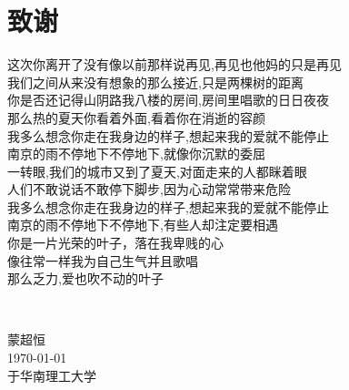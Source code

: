 \chapter{致\texorpdfstring{\quad}{}谢}
\begin{center}
这次你离开了没有像以前那样说再见,再见也他妈的只是再见 
~\\
我们之间从来没有想象的那么接近,只是两棵树的距离 
~\\
你是否还记得山阴路我八楼的房间,房间里唱歌的日日夜夜 
~\\
那么热的夏天你看着外面,看着你在消逝的容颜 
~\\
我多么想念你走在我身边的样子,想起来我的爱就不能停止 
~\\
南京的雨不停地下不停地下,就像你沉默的委屈 
~\\
一转眼,我们的城市又到了夏天,对面走来的人都眯着眼 
~\\
人们不敢说话不敢停下脚步,因为心动常常带来危险 
~\\
我多么想念你走在我身边的样子,想起来我的爱就不能停止 
~\\
南京的雨不停地下不停地下,有些人却注定要相遇 
~\\
你是一片光荣的叶子，落在我卑贱的心 
~\\
像往常一样我为自己生气并且歌唱 
~\\
那么乏力,爱也吹不动的叶子 
\end{center}

~\\

\begin{minipage}[t]{0.945\textwidth}%
	\begin{flushright}
		蒙超恒\\
		\today\\	%
		于华南理工大学
		\par\end{flushright}
\end{minipage}

